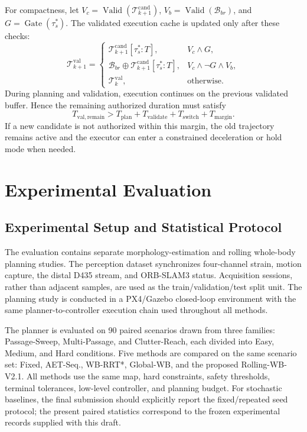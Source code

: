 \documentclass[journal,twoside]{IEEEtran}
\begin{document}
For compactness, let $V_c=\operatorname{Valid}(\mathcal T_{k+1}^{\mathrm{cand}})$, $V_b=\operatorname{Valid}(\mathcal B_{br})$, and $G=\operatorname{Gate}(\tau_s^*)$. The validated execution cache is updated only after these checks:
\begin{equation}
\mathcal T_{k+1}^{\mathrm{val}}=
\begin{cases}
\mathcal T_{k+1}^{\mathrm{cand}}[\tau_s^*:T],&V_c\land G,\\
\mathcal B_{br}\oplus\mathcal T_{k+1}^{\mathrm{cand}}[\tau_s^*:T],
&V_c\land\neg G\land V_b,\\
\mathcal T_k^{\mathrm{val}},&\text{otherwise}.
\end{cases}
\label{eq:validated_cache}
\end{equation}
During planning and validation, execution continues on the previous validated buffer. Hence the remaining authorized duration must satisfy
\begin{equation}
T_{\mathrm{val,remain}}>
T_{\mathrm{plan}}+T_{\mathrm{validate}}+T_{\mathrm{switch}}+T_{\mathrm{margin}}.
\label{eq:buffer_margin}
\end{equation}
If a new candidate is not authorized within this margin, the old trajectory remains active and the executor can enter a constrained deceleration or hold mode when needed.

\section{Experimental Evaluation}
\subsection{Experimental Setup and Statistical Protocol}
The evaluation contains separate morphology-estimation and rolling whole-body planning studies. The perception dataset synchronizes four-channel strain, motion capture, the distal D435 stream, and ORB-SLAM3 status. Acquisition sessions, rather than adjacent samples, are used as the train/validation/test split unit. The planning study is conducted in a PX4/Gazebo closed-loop environment with the same planner-to-controller execution chain used throughout all methods.

The planner is evaluated on 90 paired scenarios drawn from three families: Passage-Sweep, Multi-Passage, and Clutter-Reach, each divided into Easy, Medium, and Hard conditions. Five methods are compared on the same scenario set: Fixed, AET-Seq., WB-RRT*, Global-WB, and the proposed Rolling-WB-V2.1. All methods use the same map, hard constraints, safety thresholds, terminal tolerances, low-level controller, and planning budget. For stochastic baselines, the final submission should explicitly report the fixed/repeated seed protocol; the present paired statistics correspond to the frozen experimental records supplied with this draft.
\end{document}

